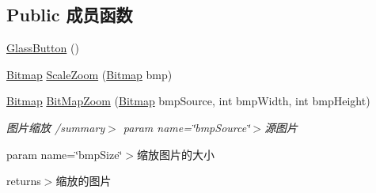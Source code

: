 \subsection*{Public 成员函数}
\begin{DoxyCompactItemize}
\item 
\hyperlink{classcustom__cloud_1_1_glass_button_afc0a6caa165816390dd4950e8a71621e}{Glass\+Button} ()
\item 
\hyperlink{classcustom__cloud_1_1_glass_button_a8c1e11783aa485f2b32c29e276a0a19b}{Bitmap} \hyperlink{classcustom__cloud_1_1_glass_button_a508269ddd0cc49332cbb16645e03debb}{Scale\+Zoom} (\hyperlink{classcustom__cloud_1_1_glass_button_a8c1e11783aa485f2b32c29e276a0a19b}{Bitmap} bmp)
\item 
\hyperlink{classcustom__cloud_1_1_glass_button_a8c1e11783aa485f2b32c29e276a0a19b}{Bitmap} \hyperlink{classcustom__cloud_1_1_glass_button_a02da6ff048ffb4c08ad80dd26b633615}{Bit\+Map\+Zoom} (\hyperlink{classcustom__cloud_1_1_glass_button_a8c1e11783aa485f2b32c29e276a0a19b}{Bitmap} bmp\+Source, int bmp\+Width, int bmp\+Height)
\begin{DoxyCompactList}\small\item\em 图片缩放 /summary$>$ param name=\char`\"{}bmp\+Source\char`\"{}$>$源图片

param name=\char`\"{}bmp\+Size\char`\"{}$>$缩放图片的大小

returns$>$缩放的图片\end{DoxyCompactList}\end{DoxyCompactItemize}

